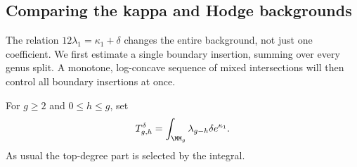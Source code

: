 \subsection{Comparing the kappa and Hodge backgrounds}
\label{subsec:s08:05}

The relation $12\lambda_1=\kappa_1+\delta$ changes the entire
background, not just one coefficient. We first estimate a single
boundary insertion, summing over every genus split. A monotone,
log-concave sequence of mixed intersections will then control all
boundary insertions at once.

For $g\geq2$ and $0\leq h\leq g$, set
\begin{equation}\label{eq:s08:node-definition}
 T_{g,h}^{\delta}
   =\int_{\MM_g}\lambda_{g-h}\delta e^{\kappa_1}.
\end{equation}
As usual the top-degree part is selected by the integral.

